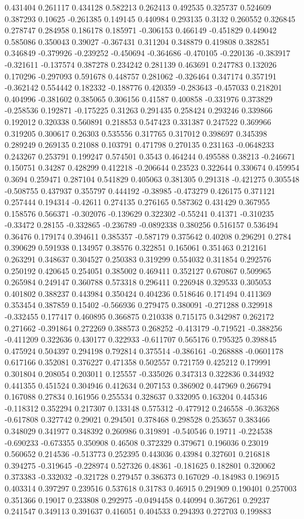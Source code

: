 0.431404 0.261117 0.434128 0.582213 0.262413 0.492535 0.325737 0.524609 0.387293 0.10625 -0.261385 0.149145 0.440984 0.293135 0.3132 0.260552 0.326845 0.278747 0.284958 0.186178 0.185971 -0.306153 0.466149 -0.451829 0.449042 0.585086 0.350043 0.39027 -0.367431 0.311204 0.348879 0.419808 0.382851 0.346849 -0.379926 -0.239252 -0.450694 -0.364686 -0.470105 -0.220136 -0.383917 -0.321611 -0.137574 0.387278 0.234242 0.281139 0.463691 0.247783 0.132026 0.170296 -0.297093 0.591678 0.448757 0.281062 -0.326464 0.347174 0.357191 -0.362142 0.554442 0.182332 -0.188776 0.420359 -0.283643 -0.457033 0.218201 0.404996 -0.381602 0.385065 0.306156 0.41587 0.400858 -0.331976 0.373829 -0.258536 0.192871 -0.175225 0.31263 0.291435 0.258424 0.293246 0.339866 0.192012 0.320338 0.560891 0.218853 0.547423 0.331387 0.247522 0.369966 0.319205 0.300617 0.26303 0.535556 0.317765 0.317012 0.398697 0.345398 0.289249 0.269135 0.21088 0.103791 0.471798 0.270135 0.231163 -0.0648233 0.243267 0.253791 0.199247 0.574501 0.3543 0.464244 0.495588 0.38213 -0.246671 0.150751 0.34287 0.428299 0.412218 -0.206644 0.23523 0.322644 0.330674 0.459954 0.3694 0.259471 0.287104 0.541829 0.405063 0.381305 0.291318 -0.421275 0.305548 -0.508755 0.437937 0.355797 0.444192 -0.38985 -0.473279 0.426175 0.371121 0.257444 0.194314 -0.42611 0.274135 0.276165 0.587362 0.431429 0.367955 0.158576 0.566371 -0.302076 -0.139629 0.322302 -0.55241 0.41371 -0.310235 -0.33472 0.28155 -0.332865 -0.236789 -0.0892338 0.380256 0.516157 0.536494 0.36476 0.179174 0.394611 0.385357 -0.587179 0.375642 0.40208 0.296291 0.2784 0.390629 0.591938 0.134957 0.38576 0.322851 0.165061 0.351463 0.212161 0.263291 0.348637 0.304527 0.250383 0.319299 0.554032 0.311854 0.292576 0.250192 0.420645 0.254051 0.385002 0.469411 0.352127 0.670867 0.509965 0.265984 0.249147 0.360788 0.573318 0.296411 0.226948 0.329533 0.305053 0.401802 0.388237 0.443984 0.350424 0.404236 0.518646 0.171494 0.411369 0.353454 0.387859 0.15402 -0.566936 0.279475 0.380091 -0.271288 0.329918 -0.332455 0.177417 0.460895 0.366875 0.210338 0.715175 0.342987 0.262172 0.271662 -0.391864 0.272269 0.388573 0.268252 -0.413179 -0.719521 -0.388256 -0.411209 0.322636 0.430177 0.322933 -0.611707 0.565176 0.795325 0.398845 0.475924 0.504397 0.294198 0.792814 0.375514 -0.386161 -0.268888 -0.0601178 0.617166 0.352081 0.376227 0.471358 0.502557 0.721759 0.425212 0.179991 0.301804 0.208054 0.203011 0.125557 -0.335026 0.347313 0.322836 0.344932 0.441355 0.451524 0.304946 0.412634 0.207153 0.386902 0.447969 0.266794 0.167088 0.27834 0.161956 0.255534 0.328637 0.332095 0.163204 0.445346 -0.118312 0.352294 0.217307 0.133148 0.575312 -0.477912 0.246558 -0.363268 -0.617808 0.327742 0.29021 0.294501 0.378468 0.298528 0.253657 0.383466 0.348029 0.341977 0.348392 0.260986 0.319891 -0.540546 0.19711 -0.224538 -0.690233 -0.673355 0.350908 0.46508 0.372329 0.379671 0.196036 0.23019 0.560652 0.214536 -0.513773 0.252395 0.443036 0.43984 0.327601 0.216818 0.394275 -0.319645 -0.228974 0.527326 0.48361 -0.181625 0.182801 0.320062 0.373383 -0.332032 -0.321728 0.279457 0.386373 0.167029 -0.184983 0.196915 0.403314 0.397297 0.239516 0.537618 0.31783 0.46915 0.291909 0.190401 0.257003 0.351366 0.19017 0.233808 0.292975 -0.0494458 0.440994 0.367261 0.29237 0.241547 0.349113 0.391637 0.416051 0.404533 0.294393 0.272703 0.199883 